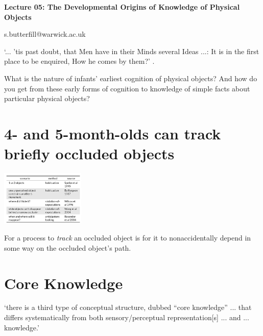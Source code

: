 \documentclass[12pt]{extarticle}
\date{}
\makeatletter
\def \ititle {Philosophical Psychology}
\def \iemail{s.butterfill@warwick.ac.uk}
\makeatother
\begin{document}
\begin{multicols*}{3}

\setlength\footnotesep{1em}











\def \ititle {Lecture 05: The Developmental Origins of Knowledge of Physical Objects}

\begin{center}

{\Large

\textbf{\ititle}

}



\iemail %

\end{center}


‘... ’tis past doubt, that Men have in their Minds several Ideas ...: It is in the first place to be enquired, How he comes by them?’ \citep[p.~104]{Locke:1975qo}.

What is the nature of infants’ earliest cognition of physical objects?
And how do you get from these early forms of cognition to
knowledge of simple facts about particular physical objects?

\section{4- and 5-month-olds can track briefly occluded objects}

\begin{center}
\includegraphics[width=0.3\textwidth]{fig/table1.png}
\end{center}

For a process to \emph{track} an occluded object
is for it to nonaccidentally  depend in some way on
the occluded object’s path.


\section{Core Knowledge}
‘there is a third type of conceptual structure, dubbed “core knowledge” ... that differs systematically from both sensory/perceptual representation[s] ... and ... knowledge.’
\citep[p.~10]{carey:2009_origin}


\end{multicols*}
\end{document}

